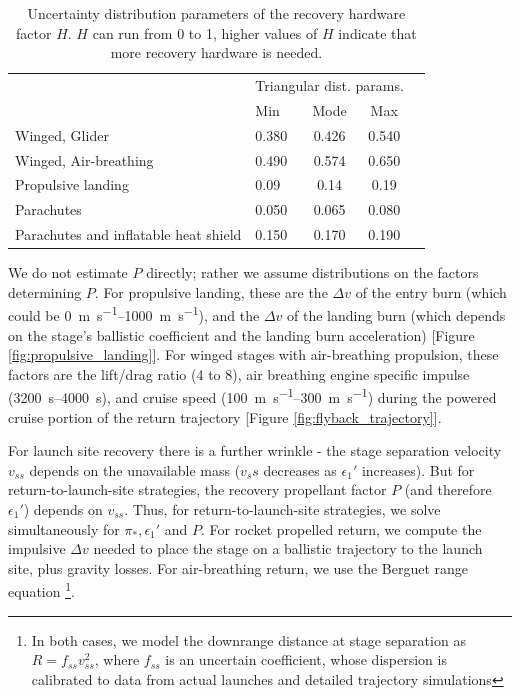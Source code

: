 \documentclass[conf]{new-aiaa}
\begin{document}
\begin{table}[hbt!]
    \centering
    \caption{\label{tab:hardware_factor_distributions} Uncertainty distribution parameters of the recovery hardware factor $H$. $H$ can run from 0 to 1, higher values of $H$ indicate that more recovery hardware is needed.}
    \begin{tabular}{l l c c c}
    \hline
     & \multicolumn{3}{c}{Triangular dist. params.} \\
     & Min & Mode & Max \\
    \hline
    \hline
    Winged, Glider  & 0.380 & 0.426 & 0.540 \\
    Winged, Air-breathing & 0.490 & 0.574 & 0.650 \\
    \hline
    Propulsive landing  & 0.09 & 0.14 & 0.19 \\
    \hline
    Parachutes & 0.050 & 0.065 & 0.080 \\
    Parachutes and inflatable heat shield  & 0.150 & 0.170 & 0.190 \\
    \hline
    \end{tabular}
\end{table}

We do not estimate $P$ directly; rather we assume distributions on the factors determining $P$. For propulsive landing, these are the $\Delta v$ of the entry burn (which could be \SIrange{0}{1000}{\meter\per\second}), and the $\Delta v$ of the landing burn (which depends on the stage's ballistic coefficient and the landing burn acceleration) [Figure \ref{fig:propulsive_landing}]. For winged stages with air-breathing propulsion, these factors are the lift/drag ratio (4 to 8), air breathing engine specific impulse (\SIrange{3200}{4000}{\second}), and cruise speed (\SIrange{100}{300}{\meter\per\second}) during the powered cruise portion of the return trajectory [Figure \ref{fig:flyback_trajectory}].

For launch site recovery there is a further wrinkle - the stage separation velocity $v_{ss}$ depends on the unavailable mass ($v_ss$ decreases as $\epsilon_1'$ increases). But for return-to-launch-site strategies, the recovery propellant factor $P$ (and therefore $\epsilon_1'$) depends on $v_{ss}$. Thus, for return-to-launch-site strategies, we solve simultaneously for $\pi_*, \epsilon_1'$ and $P$. For rocket propelled return, we compute the impulsive $\Delta v$ needed to place the stage on a ballistic trajectory to the launch site, plus gravity losses. For air-breathing return, we use the Berguet range equation \footnote{In both cases, we model the downrange distance at stage separation as $R = f_{ss} v_{ss}^2$, where $f_{ss}$ is an uncertain coefficient, whose dispersion is calibrated to data from actual launches and detailed trajectory simulations}.
\end{document}
